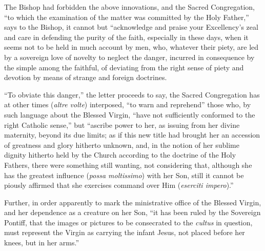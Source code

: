 The Bishop had forbidden the above innovations, and the Sacred
Congregation, ``to which the examination of the matter was committed
by the Holy Father,'' says to the Bishop, it cannot but
``acknowledge and praise your Excellency's zeal and care in
defending the purity of the faith, especially in these days, when it
seems not to be held in much account by men, who, whatever their piety,
are led by a sovereign love of novelty to neglect the danger, incurred
in consequence by the simple among the faithful, of deviating from the
right sense of piety and devotion by means of strange and foreign
doctrines.


``To obviate this danger,'' the letter proceeds to say, the
Sacred Congregation has at other times (\emph{altre volte}) interposed,
``to warn and reprehend'' those who, by such language about the
Blessed Virgin, ``have not sufficiently conformed to the right
Catholic sense,'' but ``ascribe power to her, as issuing from
her divine maternity, beyond its due limits; as if this new title had
brought her an accession of greatness and glory hitherto unknown, and,
in the notion of her sublime dignity hitherto held by the Church
according to the doctrine of the Holy Fathers, there were something
still wanting, not considering that, although she has the greatest
influence (\emph{possa moltissimo}) with her Son, still it cannot be
piously affirmed that she exercises command over Him (\emph{eserciti impero}).''


Further, in order apparently to mark the ministrative office of the
Blessed Virgin, and her dependence as a creature on her Son, ``it
has been ruled by the Sovereign Pontiff, that the images or pictures to
be consecrated to the \emph{cultus} in question, must represent the
Virgin as carrying the infant Jesus, not placed before her knees, but in
her arms.''
